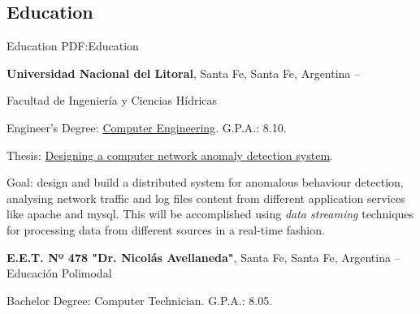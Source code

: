 \documentclass[letterpaper,MMMyyyy,nonstop]{simpleresumecv}
\begin{document}
\begin{body}


\section
{Education}
{Education}
{PDF:Education}

\textbf{Universidad Nacional del Litoral},
Santa Fe, Santa Fe, Argentina
\hfill
{} --

\BulletItem Facultad de Ingeniería y Ciencias Hídricas
\begin{detail}
	\SubBulletItem
	Engineer's Degree: \href{http://fich.unl.edu.ar/planificaciones/carrera.php?id=3}{Computer Engineering}.
	\SubBulletItem
	G.P.A.: 8.10.
\end{detail}
\BulletItem	Thesis: \href{https://github.com/leandropineda/sketch-ws}{Designing a computer network anomaly detection system}.
\begin{detail}
	\SubBulletItem
	Goal: design and build a distributed system for anomalous behaviour detection, analysing network traffic and log files content from different application services like apache and mysql. This will be accomplished using \textit{data streaming} techniques for processing data from different sources in a real-time fashion.

	
\end{detail}

\BigGap
\textbf{E.E.T. Nº 478 "Dr. Nicolás Avellaneda"},
Santa Fe, Santa Fe, Argentina
\hfill
{} --
\BulletItem Educación Polimodal
\begin{detail}
	\SubBulletItem
	Bachelor Degree: Computer Technician.
	\SubBulletItem
	G.P.A.: 8.05.
\end{detail}

%
%



\end{body}
\end{document}
